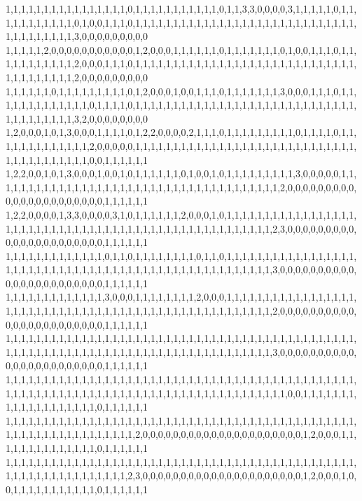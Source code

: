 1,1,1,1,1,1,1,1,1,1,1,1,1,1,1,1,0,1,1,1,1,1,1,1,1,1,1,1,0,1,1,3,3,0,0,0,0,3,1,1,1,1,1,0,1,1,1,1,1,1,1,1,1,1,1,0,1,0,0,1,1,1,0,1,1,1,1,1,1,1,1,1,1,1,1,1,1,1,1,1,1,1,1,1,1,1,1,1,1,1,1,1,1,1,1,1,1,1,1,1,1,3,0,0,0,0,0,0,0,0,0
1,1,1,1,1,2,0,0,0,0,0,0,0,0,0,0,0,1,2,0,0,0,1,1,1,1,1,1,0,1,1,1,1,1,1,1,0,1,0,0,1,1,1,0,1,1,1,1,1,1,1,1,1,1,1,2,0,0,0,1,1,1,0,1,1,1,1,1,1,1,1,1,1,1,1,1,1,1,1,1,1,1,1,1,1,1,1,1,1,1,1,1,1,1,1,1,1,1,1,1,1,2,0,0,0,0,0,0,0,0,0
1,1,1,1,1,1,0,1,1,1,1,1,1,1,1,1,0,1,2,0,0,0,1,0,0,1,1,1,0,1,1,1,1,1,1,1,3,0,0,0,1,1,1,0,1,1,1,1,1,1,1,1,1,1,1,1,1,0,1,1,1,1,0,1,1,1,1,1,1,1,1,1,1,1,1,1,1,1,1,1,1,1,1,1,1,1,1,1,1,1,1,1,1,1,1,1,1,1,1,1,1,3,2,0,0,0,0,0,0,0,0
1,2,0,0,0,1,0,1,3,0,0,0,1,1,1,1,0,1,2,2,0,0,0,0,2,1,1,1,0,1,1,1,1,1,1,1,1,1,0,1,1,1,1,0,1,1,1,1,1,1,1,1,1,1,1,1,1,2,0,0,0,0,0,1,1,1,1,1,1,1,1,1,1,1,1,1,1,1,1,1,1,1,1,1,1,1,1,1,1,1,1,1,1,1,1,1,1,1,1,1,1,1,1,0,0,1,1,1,1,1,1
1,2,2,0,0,1,0,1,3,0,0,0,1,0,0,1,0,1,1,1,1,1,1,0,1,0,0,1,0,1,1,1,1,1,1,1,1,1,3,0,0,0,0,0,1,1,1,1,1,1,1,1,1,1,1,1,1,1,1,1,1,1,1,1,1,1,1,1,1,1,1,1,1,1,1,1,1,1,1,1,1,1,2,0,0,0,0,0,0,0,0,0,0,0,0,0,0,0,0,0,0,0,0,0,0,1,1,1,1,1,1
1,2,2,0,0,0,0,1,3,3,0,0,0,0,3,1,0,1,1,1,1,1,1,2,0,0,0,1,0,1,1,1,1,1,1,1,1,1,1,1,1,1,1,1,1,1,1,1,1,1,1,1,1,1,1,1,1,1,1,1,1,1,1,1,1,1,1,1,1,1,1,1,1,1,1,1,1,1,1,1,1,2,3,0,0,0,0,0,0,0,0,0,0,0,0,0,0,0,0,0,0,0,0,0,0,1,1,1,1,1,1
1,1,1,1,1,1,1,1,1,1,1,1,1,0,1,1,0,1,1,1,1,1,1,1,1,0,1,1,0,1,1,1,1,1,1,1,1,1,1,1,1,1,1,1,1,1,1,1,1,1,1,1,1,1,1,1,1,1,1,1,1,1,1,1,1,1,1,1,1,1,1,1,1,1,1,1,1,1,1,1,1,3,0,0,0,0,0,0,0,0,0,0,0,0,0,0,0,0,0,0,0,0,0,0,0,1,1,1,1,1,1
1,1,1,1,1,1,1,1,1,1,1,1,1,3,0,0,0,1,1,1,1,1,1,1,1,2,0,0,0,1,1,1,1,1,1,1,1,1,1,1,1,1,1,1,1,1,1,1,1,1,1,1,1,1,1,1,1,1,1,1,1,1,1,1,1,1,1,1,1,1,1,1,1,1,1,1,1,1,1,1,1,2,0,0,0,0,0,0,0,0,0,0,0,0,0,0,0,0,0,0,0,0,0,0,0,1,1,1,1,1,1
1,1,1,1,1,1,1,1,1,1,1,1,1,1,1,1,1,1,1,1,1,1,1,1,1,1,1,1,1,1,1,1,1,1,1,1,1,1,1,1,1,1,1,1,1,1,1,1,1,1,1,1,1,1,1,1,1,1,1,1,1,1,1,1,1,1,1,1,1,1,1,1,1,1,1,1,1,1,1,1,1,3,0,0,0,0,0,0,0,0,0,0,0,0,0,0,0,0,0,0,0,0,0,0,0,1,1,1,1,1,1
1,1,1,1,1,1,1,1,1,1,1,1,1,1,1,1,1,1,1,1,1,1,1,1,1,1,1,1,1,1,1,1,1,1,1,1,1,1,1,1,1,1,1,1,1,1,1,1,1,1,1,1,1,1,1,1,1,1,1,1,1,1,1,1,1,1,1,1,1,1,1,1,1,1,1,1,1,1,1,1,1,1,1,0,0,1,1,1,1,1,1,1,1,1,1,1,1,1,1,1,1,1,1,1,0,1,1,1,1,1,1
1,1,1,1,1,1,1,1,1,1,1,1,1,1,1,1,1,1,1,1,1,1,1,1,1,1,1,1,1,1,1,1,1,1,1,1,1,1,1,1,1,1,1,1,1,1,1,1,1,1,1,1,1,1,1,1,1,1,1,1,1,1,1,2,0,0,0,0,0,0,0,0,0,0,0,0,0,0,0,0,0,0,0,0,0,1,2,0,0,0,1,1,1,1,1,1,1,1,1,1,1,1,1,1,0,1,1,1,1,1,1
1,1,1,1,1,1,1,1,1,1,1,1,1,1,1,1,1,1,1,1,1,1,1,1,1,1,1,1,1,1,1,1,1,1,1,1,1,1,1,1,1,1,1,1,1,1,1,1,1,1,1,1,1,1,1,1,1,1,1,1,1,1,2,3,0,0,0,0,0,0,0,0,0,0,0,0,0,0,0,0,0,0,0,0,0,1,2,0,0,0,1,0,0,1,1,1,1,1,1,1,1,1,1,1,0,1,1,1,1,1,1
